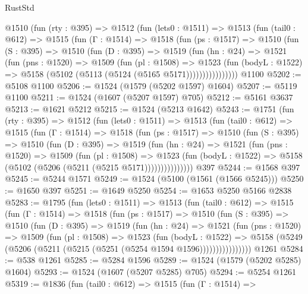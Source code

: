 \begin{lexlean}{RustStd}
\begin{coremodule}
    @1510
      (fun (rty : @395) =>
      @1512
        (fun (lets0 : @1511) =>
        @1513
          (fun (tail0 : @612) =>
          @1515
            (fun (Γ : @1514) =>
            @1518
              (fun (ps : @1517) =>
              @1510
                (fun (S : @395) =>
                @1510
                  (fun (D : @395) =>
                  @1519
                    (fun (hn : @24) =>
                    @1521
                      (fun (pns : @1520) =>
                      @1509
                        (fun (pl : @1508) =>
                        @1523
                          (fun (bodyL : @1522) =>
                          @5158 (@5102 (@5113 (@5124 (@5165 @5171))))))))))))))))
    @1100
@5202 := @5108 @1100
@5206 := @1524 (@1579 (@5202 @1597) @1604)
@5207 := @5119 @1100
@5211 := @1524 (@1607 (@5207 @1597) @705)
@5212 := @5161 @3637
@5213 := @1621 @5212
@5215 := @1524 (@5213 @1642)
@5243 := @1751
    (fun (rty : @395) =>
    @1512
      (fun (lets0 : @1511) =>
      @1513
        (fun (tail0 : @612) =>
        @1515
          (fun (Γ : @1514) =>
          @1518
            (fun (ps : @1517) =>
            @1510
              (fun (S : @395) =>
              @1510
                (fun (D : @395) =>
                @1519
                  (fun (hn : @24) =>
                  @1521
                    (fun (pns : @1520) =>
                    @1509
                      (fun (pl : @1508) =>
                      @1523
                        (fun (bodyL : @1522) =>
                        @5158 (@5102 (@5206 (@5211 (@5215 @5171)))))))))))))))
    @397
@5244 := @1568 @397
@5245 := @5244 @1571
@5249 := @1524 (@5100 (@1561 (@1566 @5245)))
@5250 := @1650 @397
@5251 := @1649 @5250
@5254 := @1653 @5250 @5166 @2838
@5283 := @1795
    (fun (lets0 : @1511) =>
    @1513
      (fun (tail0 : @612) =>
      @1515
        (fun (Γ : @1514) =>
        @1518
          (fun (ps : @1517) =>
          @1510
            (fun (S : @395) =>
            @1510
              (fun (D : @395) =>
              @1519
                (fun (hn : @24) =>
                @1521
                  (fun (pns : @1520) =>
                  @1509
                    (fun (pl : @1508) =>
                    @1523
                      (fun (bodyL : @1522) =>
                      @5158 (@5249 (@5206 (@5211 (@5215 (@5251 (@5254 @1594 @1596))))))))))))))))
    @1261
@5284 := @538 @1261
@5285 := @5284 @1596
@5289 := @1524 (@1579 (@5202 @5285) @1604)
@5293 := @1524 (@1607 (@5207 @5285) @705)
@5294 := @5254 @1261
@5319 := @1836
    (fun (tail0 : @612) =>
    @1515
      (fun (Γ : @1514) =>

\end{coremodule}
\end{lexlean}
